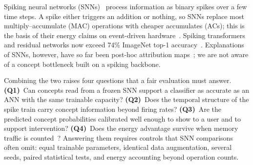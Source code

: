 \documentclass[conference]{IEEEtran}
\begin{document}
Spiking neural networks (SNNs)~\cite{maass1997networks,roy2019towards} process information as binary spikes over a few time steps. A spike either triggers an addition or nothing, so SNNs replace most multiply--accumulate (MAC) operations with cheaper accumulates (ACs); this is the basis of their energy claims on event-driven hardware~\cite{davies2018loihi}. Spiking transformers and residual networks now exceed 74\% ImageNet top-1 accuracy~\cite{zhou2023spikformer,yao2023spike,shi2024spikingresformer}. Explanations of SNNs, however, have so far been post-hoc attribution maps~\cite{kim2021visual,bitar2023gradient,nguyen2023feature}; we are not aware of a concept bottleneck built on a spiking backbone.

Combining the two raises four questions that a fair evaluation must answer. \textbf{(Q1)}~Can concepts read from a frozen SNN support a classifier as accurate as an ANN with the same trainable capacity? \textbf{(Q2)}~Does the temporal structure of the spike train carry concept information beyond firing rates? \textbf{(Q3)}~Are the predicted concept probabilities calibrated well enough to show to a user and to support intervention? \textbf{(Q4)}~Does the energy advantage survive when memory traffic is counted~\cite{dampfhoffer2023snns}? Answering them requires controls that SNN comparisons often omit: equal trainable parameters, identical data augmentation, several seeds, paired statistical tests, and energy accounting beyond operation counts.
\end{document}
